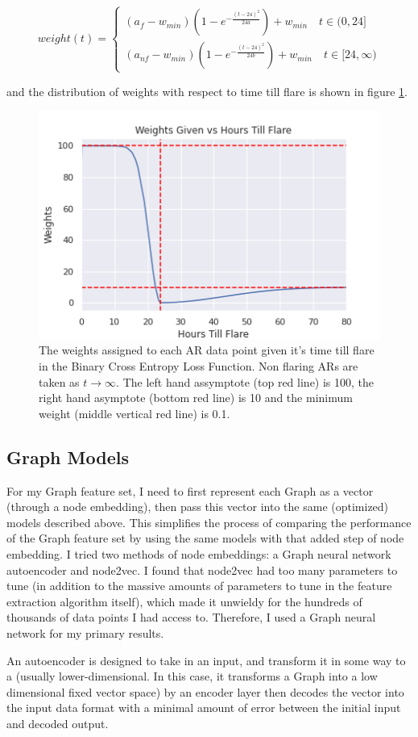 \[weight(t) = 
\begin{cases}
    (a_f - w_{min})(1 - e^{-\frac{(t - 24)^2}{24a}}) + w_{min} \quad t \in (0, 24]\\
    (a_{nf} - w_{min})(1 - e^{-\frac{(t - 24)^2}{24b}}) + w_{min} \quad t \in [24, \infty)
\end{cases}
\]

and the distribution of weights with respect to time till flare is shown in figure \ref{fig:weights}.
\begin{figure}
    \centering
    \includegraphics[width=0.5\linewidth]{ThesisFilePkg/figures/methods/weights.png}
    \caption{The weights assigned to each AR data point given it's time till flare in the Binary Cross Entropy Loss Function. Non flaring ARs are taken as $t \rightarrow \infty$. The left hand assymptote (top red line) is 100, the right hand asymptote (bottom red line) is 10 and the minimum weight (middle vertical red line) is 0.1.}
    \label{fig:weights}
\end{figure}

\subsection{Graph Models}

For my Graph feature set, I need to first represent each Graph as a vector (through a node embedding), then pass this vector into the same (optimized) models described above. This simplifies the process of comparing the performance of the Graph feature set by using the same models with that added step of node embedding. I tried two methods of node embeddings: a Graph neural network autoencoder and node2vec. I found that node2vec had too many parameters to tune (in addition to the massive amounts of parameters to tune in the feature extraction algorithm itself), which made it unwieldy for the hundreds of thousands of data points I had access to. Therefore, I used a Graph neural network for my primary results. 

An autoencoder is designed to take in an input, and transform it in some way to a (usually lower-dimensional. In this case, it transforms a Graph into a low dimensional fixed vector space) by an encoder layer then decodes the vector into the input data format with a minimal amount of error between the initial input and decoded output. 

